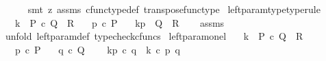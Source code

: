\begin{isabellebody}
\ \ \ \ \isamarkupfalse%
\ {\isacharparenleft}{\kern0pt}smt\ {\isacharparenleft}{\kern0pt}z{}{\isacharparenright}{\kern0pt}\ assms\ cfunc{\isacharunderscore}{\kern0pt}type{\isacharunderscore}{\kern0pt}def\ transpose{\isacharunderscore}{\kern0pt}func{\isacharunderscore}{\kern0pt}type{\isacharparenright}{\kern0pt}\isanewline
{}\isamarkupfalse%
%
\endisatagproof
{\isafoldproof}%
%
\isadelimproof
\isanewline
%
\endisadelimproof
\isanewline
{}\isamarkupfalse%
\ left{\isacharunderscore}{\kern0pt}param{\isacharunderscore}{\kern0pt}type{\isacharbrackleft}{\kern0pt}type{\isacharunderscore}{\kern0pt}rule{\isacharbrackright}{\kern0pt}{\isacharcolon}{\kern0pt}\isanewline
\ \ \ {\isachardoublequoteopen}k\ {\isacharcolon}{\kern0pt}\ P\ {\isasymtimes}\isactrlsub c\ Q\ {\isasymrightarrow}\ R{\isachardoublequoteclose}\isanewline
\ \ \ {\isachardoublequoteopen}p\ {\isasymin}\isactrlsub c\ P{\isachardoublequoteclose}\isanewline
\ \ \ {\isachardoublequoteopen}k\isactrlbsub {\isacharbrackleft}{\kern0pt}p{\isacharcomma}{\kern0pt}{\isacharminus}{\kern0pt}{\isacharbrackright}{\kern0pt}\isactrlesub \ {\isacharcolon}{\kern0pt}\ Q\ {\isasymrightarrow}\ R{\isachardoublequoteclose}\isanewline
%
\isadelimproof
\ \ %
\endisadelimproof
%
\isatagproof
{}\isamarkupfalse%
\ assms\ \isamarkupfalse%
\ {\isacharparenleft}{\kern0pt}unfold\ left{\isacharunderscore}{\kern0pt}param{\isacharunderscore}{\kern0pt}def{}{\isacharcomma}{\kern0pt}\ typecheck{\isacharunderscore}{\kern0pt}cfuncs{\isacharparenright}{\kern0pt}%
\endisatagproof
{\isafoldproof}%
%
\isadelimproof
\isanewline
%
\endisadelimproof
\isanewline
{}\isamarkupfalse%
\ left{\isacharunderscore}{\kern0pt}param{\isacharunderscore}{\kern0pt}on{\isacharunderscore}{\kern0pt}el{\isacharcolon}{\kern0pt}\isanewline
\ \ \ {\isachardoublequoteopen}k\ {\isacharcolon}{\kern0pt}\ P\ {\isasymtimes}\isactrlsub c\ Q\ {\isasymrightarrow}\ R{\isachardoublequoteclose}\isanewline
\ \ \ {\isachardoublequoteopen}p\ {\isasymin}\isactrlsub c\ P{\isachardoublequoteclose}\isanewline
\ \ \ {\isachardoublequoteopen}q\ {\isasymin}\isactrlsub c\ Q{\isachardoublequoteclose}\isanewline
\ \ \ \ {\isachardoublequoteopen}k\isactrlbsub {\isacharbrackleft}{\kern0pt}p{\isacharcomma}{\kern0pt}{\isacharminus}{\kern0pt}{\isacharbrackright}{\kern0pt}\isactrlesub \ {\isasymcirc}\isactrlsub c\ q\ {\isacharequal}{\kern0pt}\ k\ {\isasymcirc}\isactrlsub c\ {\isasymlangle}p{\isacharcomma}{\kern0pt}\ q{\isasymrangle}{\isachardoublequoteclose}\isanewline

\end{isabellebody}
